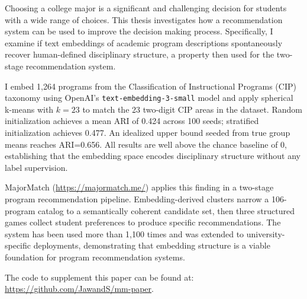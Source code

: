 \setlength{\parskip}{0.8em}
Choosing a college major is a significant and challenging decision for students with a wide range of choices. This thesis investigates how a recommendation system can be used to improve the decision making process. Specifically, I examine if text embeddings of academic program descriptions spontaneously recover human-defined disciplinary structure, a property then used for the two-stage recommendation system.

I embed 1,264 programs from the Classification of Instructional Programs (CIP) taxonomy using OpenAI's \texttt{text-embedding-3-small} model and apply spherical k-means with $k=23$ to match the 23 two-digit CIP areas in the dataset. Random initialization achieves a mean ARI of 0.424 across 100 seeds; stratified initialization achieves 0.477. An idealized upper bound seeded from true group means reaches ARI=0.656. All results are well above the chance baseline of 0, establishing that the embedding space encodes disciplinary structure without any label supervision.

MajorMatch (\href{https://majormatch.me/}{https://majormatch.me/}) applies this finding in a two-stage program recommendation pipeline. Embedding-derived clusters narrow a 106-program catalog to a semantically coherent candidate set, then three structured games collect student preferences to produce specific recommendations. The system has been used more than 1,100 times and was extended to university-specific deployments, demonstrating that embedding structure is a viable foundation for program recommendation systems.

The code to supplement this paper can be found at: \href{https://github.com/JawandS/mm-research}{https://github.com/JawandS/mm-paper}.

\newpage

